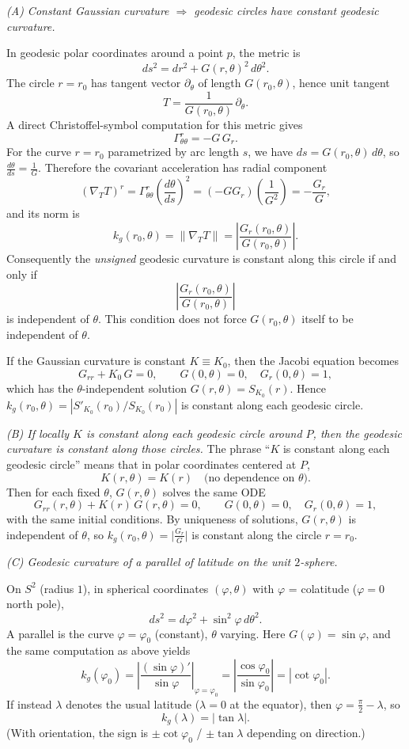 \begin{solution}
\emph{(A) Constant Gaussian curvature \(\Rightarrow\) geodesic circles have constant geodesic curvature.}

In geodesic polar coordinates around a point \(p\), the metric is
\[
ds^{2}=dr^{2}+G(r,\theta)^{2}\,d\theta^{2}.
\]
The circle \(r=r_{0}\) has tangent vector \(\partial_\theta\) of length \(G(r_0,\theta)\), hence unit tangent
\[
T=\frac{1}{G(r_0,\theta)}\,\partial_\theta.
\]
A direct Christoffel-symbol computation for this metric gives
\[
\Gamma^{r}_{\theta\theta}=-G\,G_{r}.
\]
For the curve \(r=r_0\) parametrized by arc length \(s\), we have \(ds = G(r_0,\theta)\,d\theta\), so \(\frac{d\theta}{ds}=\frac{1}{G}\). Therefore the covariant acceleration has radial component
\[
(\nabla_T T)^r=\Gamma^{r}_{\theta\theta}\left(\frac{d\theta}{ds}\right)^{2}
= (-G G_r)\left(\frac{1}{G^{2}}\right)= -\frac{G_r}{G},
\]
and its norm is
\[
k_g(r_0,\theta)=\left\lVert \nabla_T T\right\rVert=\left|\frac{G_r(r_0,\theta)}{G(r_0,\theta)}\right|.
\]
Consequently the \emph{unsigned} geodesic curvature is constant
along this circle if and only if
\[\left|\frac{G_r(r_0,\theta)}{G(r_0,\theta)}\right|\]
is independent of \(\theta\).  This condition does not force
\(G(r_0,\theta)\) itself to be independent of \(\theta\).

If the Gaussian curvature is constant \(K\equiv K_0\), then the Jacobi equation becomes
\[
G_{rr}+K_0\,G=0,\qquad G(0,\theta)=0,\quad G_r(0,\theta)=1,
\]
which has the \(\theta\)-independent solution \(G(r,\theta)=S_{K_0}(r)\). Hence \(k_g(r_0,\theta)=|S'_{K_0}(r_0)/S_{K_0}(r_0)|\) is constant along each geodesic circle.

\medskip
\emph{(B) If locally \(K\) is constant along each geodesic circle around \(P\), then the geodesic curvature is constant along those circles.}
The phrase ``\(K\) is constant along each geodesic circle'' means that in polar coordinates centered at \(P\),
\[
K(r,\theta)=K(r)\quad \text{(no dependence on }\theta\text{)}.
\]
Then for each fixed \(\theta\), \(G(r,\theta)\) solves the same ODE
\[
G_{rr}(r,\theta)+K(r)\,G(r,\theta)=0,\qquad G(0,\theta)=0,\quad G_r(0,\theta)=1,
\]
with the same initial conditions. By uniqueness of solutions, \(G(r,\theta)\) is independent of \(\theta\), so \(k_g(r_0,\theta)=\big|\frac{G_r}{G}\big|\) is constant along the circle \(r=r_0\).

\medskip
\emph{(C) Geodesic curvature of a parallel of latitude on the unit \(2\)-sphere.}

On \(S^{2}\) (radius \(1\)), in spherical coordinates \((\varphi,\theta)\) with \(\varphi\) = colatitude (\(\varphi=0\) north pole),
\[
ds^{2}=d\varphi^{2}+\sin^{2}\varphi\,d\theta^{2}.
\]
A parallel is the curve \(\varphi=\varphi_{0}\) (constant), \(\theta\) varying. Here \(G(\varphi)=\sin\varphi\), and the same computation as above yields
\[
k_g(\varphi_0)=\left|\frac{(\sin\varphi)' }{\sin\varphi}\right|_{\varphi=\varphi_0}
=\left|\frac{\cos\varphi_0}{\sin\varphi_0}\right|
=|\cot\varphi_0|.
\]
If instead \(\lambda\) denotes the usual latitude (\(\lambda=0\) at the equator), then \(\varphi=\frac{\pi}{2}-\lambda\), so
\[
k_g(\lambda)=|\tan\lambda|.
\]
(With orientation, the sign is \(\pm \cot\varphi_0\) / \(\pm\tan\lambda\) depending on direction.)



\end{solution}
